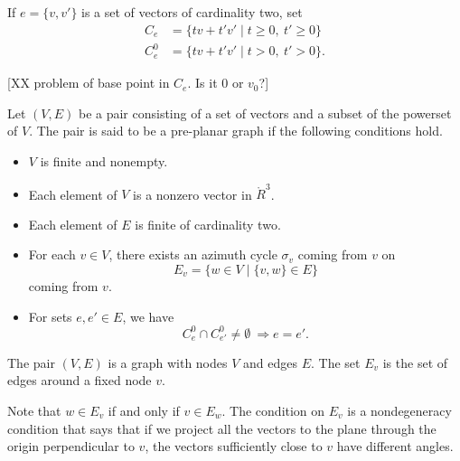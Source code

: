 
If $e=\{v,v'\}$ is a set of vectors of cardinality two,  set
  $$
  \begin{array}{lll}
  C_e &= \{t v + t' v' \mid t \ge 0,\ t'\ge 0\}\\
  C_e^0 &= \{t v + t' v' \mid t > 0,\ t' > 0\}.
  \end{array}
  $$

[XX problem of base point in $C_e$.  Is it $0$ or $v_0$?]


\begin{definition}  Let $(V,E)$ be a pair consisting of a set of
vectors and a subset of the powerset of $V$.  The pair is said to be
a pre-planar graph if the following conditions hold.
    \begin{itemize}
    \item $V$ is finite and nonempty.
    \item Each element of $V$ is a nonzero vector in $\ring{R}^3$.
    \item Each element of $E$ is finite of cardinality two.
    \item For each $v\in V$, there exists an azimuth cycle $\sigma_v$ coming from $v$ on
        $$
        E_v = \{w\in V\mid \{v,w\}\in E\}
        $$
        coming from $v$.
    \item For sets $e,e'\in E$,   we have
        $$C^0_e \cap C_{e'}^0\ne\emptyset\ \Rightarrow e = e'.$$
    \end{itemize}
\end{definition}

\begin{remark}
The pair $(V,E)$ is a graph with nodes $V$ and edges $E$.  The set
$E_v$ is the set of edges around a fixed node $v$.
\end{remark}

Note that $w\in E_v$ if and only if $v\in E_w$.   The condition on
$E_v$ is a nondegeneracy condition that says that if we project all
the vectors to the plane through the origin perpendicular to $v$,
the vectors sufficiently close to $v$ have different angles.

